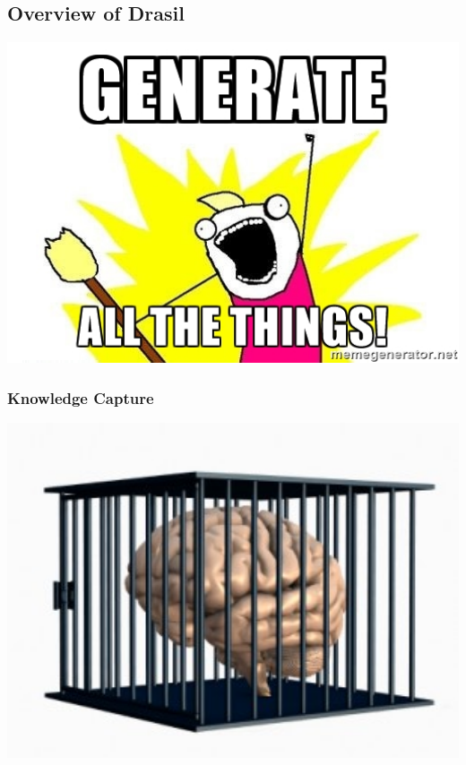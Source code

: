 \documentclass{beamer}
\begin{document}
\subsection[Overview]{Overview of Drasil}


\begin{frame}
\includegraphics[width=1\textwidth]{../WG2_11/generate_all_the_things.jpg}
\end{frame}


\begin{frame}

\frametitle{Knowledge Capture}

\includegraphics[width=1.0\textwidth]{KC.jpg}

\end{frame}
\end{document}
